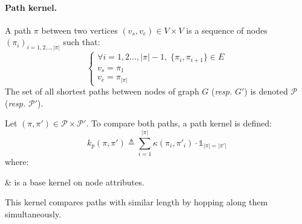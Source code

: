             \paragraph{Path kernel.}
            A path \(\pi\) between two vertices \((v_s,v_e) \in V\times V\) is a sequence of nodes \(\left(\pi_i\right)_{i=1,2\dots,\vert \pi \vert}\) such that:
            \begin{equation*}
                \begin{cases}
                    \forall i=1,2\dots,\vert \pi \vert-1,\; \{\pi_i, \pi_{i+1}\} \in E\\
                    v_s = \pi_1\\
                    v_e = \pi_{\vert \pi \vert}
                \end{cases}
            \end{equation*}
            The set of all shortest paths between nodes of graph \(G\) (\textit{resp.} \(G'\)) is denoted \(\mathscr{P}\) (\textit{resp.} \(\mathscr{P}'\)).
            
            Let \(\left(\pi, \pi'\right) \in \mathscr{P} \times \mathscr{P}'\).
            To compare both paths, a path kernel is defined:
            \begin{equation}
                \label{eq::path_kernel}
                k_p(\pi, \pi') \triangleq \sum_{i=1}^{\vert \pi \vert} \kappa\left(\pi_i, \pi'_i\right) \cdot \mathbb{1}_{\vert \pi \vert = \vert \pi' \vert}
            \end{equation}
            where:
            \begin{conditions}
                \kappa & is a base kernel on node attributes.
            \end{conditions}
            This kernel compares paths with similar length by hopping along them simultaneously.
            
